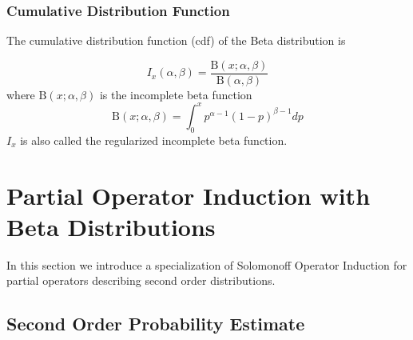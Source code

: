\documentclass[runningheads]{llncs}
\begin{document}
\subsubsection{Cumulative Distribution Function}
The cumulative distribution function (cdf) of the Beta distribution is

\begin{equation}
I_x(\alpha, \beta) = \frac{\mathrm{B}(x; \alpha,
  \beta)}{\mathrm{B}(\alpha, \beta)}
\end{equation}
where $\mathrm{B}(x; \alpha, \beta)$ is the incomplete beta function
\begin{equation}
\mathrm{B}(x; \alpha, \beta) = \int_0^x p^{\alpha - 1}(1-p)^{\beta -
  1} dp
\end{equation}
$I_x$ is also called the regularized incomplete beta function.

\section{Partial Operator Induction with Beta Distributions }
\label{part-op}

In this section we introduce a specialization of Solomonoff Operator
Induction for partial operators describing second order distributions.


\subsection{Second Order Probability Estimate}
\end{document}
